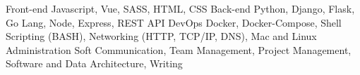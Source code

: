 

\begin{cvskills}
  \cvskill
    {Front-end} %
    {Javascript, Vue, SASS, HTML, CSS} %
  \cvskill
    {Back-end} %
    {Python, Django, Flask, Go Lang, Node, Express, REST API} %
  \cvskill
    {DevOps} %
    {Docker, Docker-Compose, Shell Scripting (BASH), Networking (HTTP, TCP/IP, DNS), Mac and Linux Administration} %
  \cvskill
    {Soft} %
    {Communication, Team Management, Project Management, Software and Data Architecture, Writing} %

\end{cvskills}
